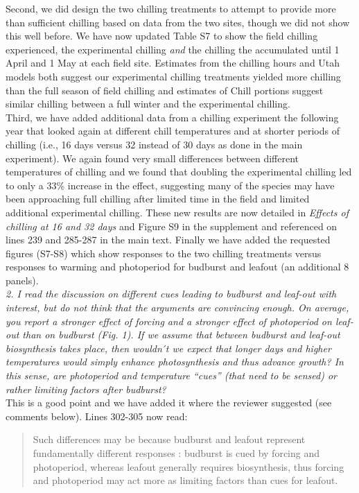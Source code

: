 \documentclass[11pt,a4paper]{article}
\begin{document}
Second, we did design the two chilling treatments to attempt to provide more than sufficient chilling based on data from the two sites, though we did not show this well before. We have now updated Table S7 to show the field chilling experienced, the experimental chilling \emph{and} the chilling the accumulated until 1 April and 1 May at each field site. Estimates from the chilling hours and Utah models both suggest our experimental chilling treatments yielded more chilling than the full season of field chilling and estimates of Chill portions suggest similar chilling between a full winter and the experimental chilling. \\

Third, we have added additional data from a chilling experiment the following year that looked again at different chill temperatures and at shorter periods of chilling (i.e., 16 days versus 32 instead of 30 days as done in the main experiment). We again found very small differences between different temperatures of chilling and we found that doubling the experimental chilling led to only a 33\% increase in the effect, suggesting many of the species may have been approaching full chilling after limited time in the field and limited additional experimental chilling. These new results are now detailed in \emph{Effects of chilling at 16 and 32 days} and Figure S9 in the supplement and referenced on lines 239 and 285-287 in the main text. Finally we have added the requested figures (S7-S8) which show responses to the two chilling treatments versus responses to warming and photoperiod for budburst and leafout (an additional 8 panels). \\

\emph{2.      I read the discussion on different cues leading to budburst and leaf-out with
interest, but do not think that the arguments are convincing enough. On average, you report a
stronger effect of forcing and a stronger effect of photoperiod on leaf-out than on budburst
(Fig. 1). If we assume that between budburst and leaf-out biosynthesis takes place, then
wouldn ́t we expect that longer days and higher temperatures would simply enhance
photosynthesis and thus advance growth? In this sense, are photoperiod and temperature “cues”
(that need to be sensed) or rather limiting factors after budburst?}\\

This is a good point and we have added it where the reviewer suggested (see comments below). Lines 302-305 now read:

\begin{quote}
Such differences may be because budburst and leafout represent fundamentally different responses \citep{Basler:2014aa}: budburst is cued by forcing and photoperiod, whereas leafout generally requires biosynthesis, thus forcing and photoperiod may act more as limiting factors than cues for leafout.  
\end{quote}
\end{document}
